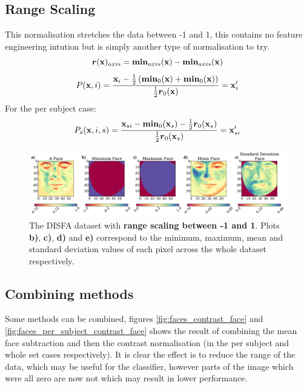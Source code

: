 \subsection{Range Scaling}
This normalisation stretches the data between -1 and 1, this contains no feature engineering
intution but is simply another type of normalisation to try.
\begin{equation}
  {\boldsymbol r}({\bf x})_{axis} = {\boldsymbol \min}_{axis}({\bf x}) - {\boldsymbol \min}_{axis}({\bf x})
\end{equation}
\begin{equation}
   P({\bf x},i) =
   \frac{{\bf x}_{i} - \frac{1}{2}\left ( {\boldsymbol \min}_0({\bf x}) + {\boldsymbol \min}_0({\bf x}) \right ) }{\frac{1}{2}{\boldsymbol r}_0({\bf x})}
   = {\bf x}_{i}'
\end{equation}
For the per subject case:
\begin{equation}
   P_s({\bf x},i,s) =
   \frac{{\bf x}_{si} - {\boldsymbol \min}_0({\bf x}_s) - \frac{1}{2}{\boldsymbol r}_0({\bf x}_s) }{\frac{1}{2}{\boldsymbol r}_0({\bf x}_s)}
   = {\bf x}_{si}'
\end{equation}
\begin{figure}[!h] \centering
\includegraphics[width =\hsize]{figures/faces_range.pdf}
\caption{The DISFA dataset with {\bf range scaling between -1 and 1}.
Plots {\bf b)}, {\bf c)}, {\bf d)} and {\bf e)} correspond to the minimum,
maximum, mean and standard deviation values of each pixel across the whole
dataset respectively.} \label{fig:simple} \end{figure}
\subsection{Combining methods}
Some methods can be combined, figures \ref{fig:faces_contrast_face} and \ref{fig:faces_per_subject_contrast_face}
shows the result of combining the mean face subtraction and then the
contrast normalisation (in the per subject and whole set cases respectively). It is clear the effect is to
reduce the range of the data, which may be useful for the classifier, however parts of the image
which were all zero are now not which may result in lower performance.

